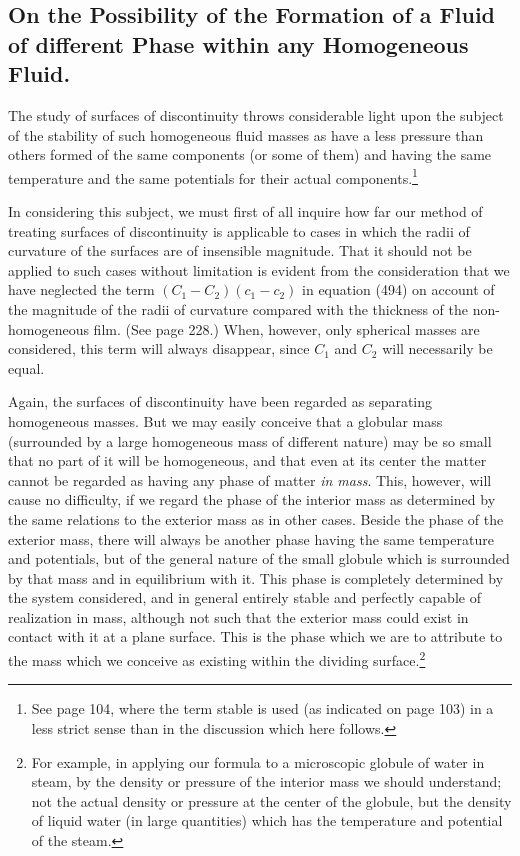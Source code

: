 \documentclass[12pt]{article}
\begin{document}
{\subsection{On the Possibility of the Formation of a Fluid of different Phase within any Homogeneous Fluid.}
The study of surfaces of discontinuity throws considerable light upon the subject of the stability of such homogeneous fluid masses as have a less pressure than others formed of the same components (or some of them) and having the same temperature and the same potentials for their actual components.\footnote{See page 104, where the term stable is used (as indicated on page 103) in a less strict sense than in the discussion which here follows.}

In considering this subject, we must first of all inquire how far our method of treating surfaces of discontinuity is applicable to cases in which the radii of curvature of the surfaces are of insensible magnitude. That it should not be applied to such cases without limitation is evident from the consideration that we have neglected the term  $(C_1-C_2) (c_1-c_2)$ in equation (494) on account of the magnitude of the radii of curvature compared with the thickness of the non-homogeneous film. (See page 228.) When, however, only spherical masses are considered, this term will always disappear, since $C_1$ and $C_2$ will necessarily be equal.

Again, the surfaces of discontinuity have been regarded as separating homogeneous masses. But we may easily conceive that a globular mass (surrounded by a large homogeneous mass of different nature) may be so small that no part of it will be homogeneous, and that even at its center the matter cannot be regarded as having any phase of matter \textit{in mass}. This, however, will cause no difficulty, if we regard the phase of the interior mass as determined by the same relations to the exterior mass as in other cases. Beside the phase of the exterior mass, there will always be another phase having the same temperature and potentials, but of the general nature of the small globule which is surrounded by that mass and in equilibrium with it. This phase is completely determined by the system considered, and in general entirely stable and perfectly capable of realization in mass, although not such that the exterior mass could exist in contact with it at a plane surface. This is the phase which we are to attribute to the mass which we conceive as existing within the dividing surface.\footnote{For example, in applying our formula to a microscopic globule of water in steam, by the density or pressure of the interior mass we should understand; not the actual density or pressure at the center of the globule, but the density of liquid water (in large quantities) which has the temperature and potential of the steam.}

}
\end{document}
